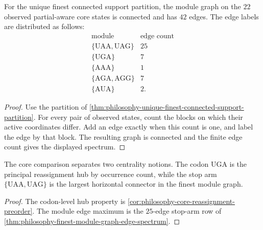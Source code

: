 \begin{theorem}
\label{thm:philosophy-finest-module-graph-edge-spectrum}
For the unique finest connected support partition, the module graph on
the $22$ observed partial-aware core states is connected and has $42$
edges. The edge labels are distributed as follows:
$$
\begin{array}{c|c}
  \text{module} & \text{edge count}\\
\hline
  \{\mathrm{UAA},\mathrm{UAG}\} & 25\\
  \{\mathrm{UGA}\} & 7\\
  \{\mathrm{AAA}\} & 1\\
  \{\mathrm{AGA},\mathrm{AGG}\} & 7\\
  \{\mathrm{AUA}\} & 2.
\end{array}
$$
\end{theorem}
\begin{proof}
Use the partition of
\autoref{thm:philosophy-unique-finest-connected-support-partition}.
For every pair of observed states, count the blocks on which their
active coordinates differ. Add an edge exactly when this count is one,
and label the edge by that block. The resulting graph is connected and
the finite edge count gives the displayed spectrum.
\end{proof}

\begin{corollary}
\label{cor:philosophy-two-centrality-readings}
The core comparison separates two centrality notions. The codon
$\mathrm{UGA}$ is the principal reassignment hub by occurrence count,
while the stop arm $\{\mathrm{UAA},\mathrm{UAG}\}$ is the largest
horizontal connector in the finest module graph.
\end{corollary}
\begin{proof}
The codon-level hub property is
\autoref{cor:philosophy-core-reassignment-preorder}. The module edge
maximum is the $25$-edge stop-arm row of
\autoref{thm:philosophy-finest-module-graph-edge-spectrum}.
\end{proof}

